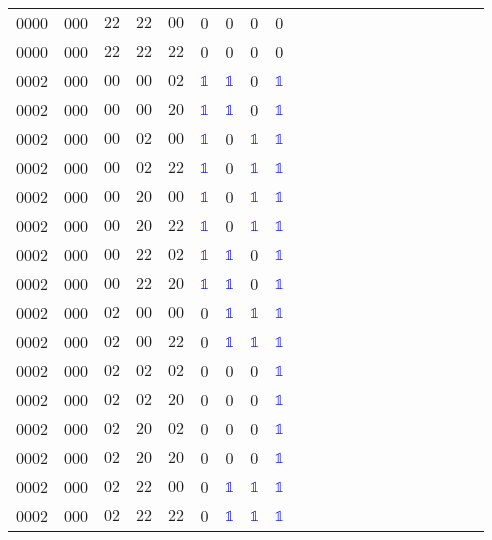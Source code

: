 \begin{longtable*}{c| cccccccccccccccccccc }
0000& 000& $22$& $22$& $00$& 0& 0& 0& 0\\
0000& 000& $22$& $22$& $22$& 0& 0& 0& 0\\
0002& 000& $00$& $00$& $02$& \textcolor{blue}{$\mathds{1}$}& \textcolor{blue}{$\mathds{1}$}& 0& \textcolor{blue}{$\mathds{1}$}\\
0002& 000& $00$& $00$& $20$& \textcolor{blue}{$\mathds{1}$}& \textcolor{blue}{$\mathds{1}$}& 0& \textcolor{blue}{$\mathds{1}$}\\
0002& 000& $00$& $02$& $00$& \textcolor{blue}{$\mathds{1}$}& 0& \textcolor{blue}{$\mathds{1}$}& \textcolor{blue}{$\mathds{1}$}\\
0002& 000& $00$& $02$& $22$& \textcolor{blue}{$\mathds{1}$}& 0& \textcolor{blue}{$\mathds{1}$}& \textcolor{blue}{$\mathds{1}$}\\
0002& 000& $00$& $20$& $00$& \textcolor{blue}{$\mathds{1}$}& 0& \textcolor{blue}{$\mathds{1}$}& \textcolor{blue}{$\mathds{1}$}\\
0002& 000& $00$& $20$& $22$& \textcolor{blue}{$\mathds{1}$}& 0& \textcolor{blue}{$\mathds{1}$}& \textcolor{blue}{$\mathds{1}$}\\
0002& 000& $00$& $22$& $02$& \textcolor{blue}{$\mathds{1}$}& \textcolor{blue}{$\mathds{1}$}& 0& \textcolor{blue}{$\mathds{1}$}\\
0002& 000& $00$& $22$& $20$& \textcolor{blue}{$\mathds{1}$}& \textcolor{blue}{$\mathds{1}$}& 0& \textcolor{blue}{$\mathds{1}$}\\
0002& 000& $02$& $00$& $00$& 0& \textcolor{blue}{$\mathds{1}$}& \textcolor{blue}{$\mathds{1}$}& \textcolor{blue}{$\mathds{1}$}\\
0002& 000& $02$& $00$& $22$& 0& \textcolor{blue}{$\mathds{1}$}& \textcolor{blue}{$\mathds{1}$}& \textcolor{blue}{$\mathds{1}$}\\
0002& 000& $02$& $02$& $02$& 0& 0& 0& \textcolor{blue}{$\mathds{1}$}\\
0002& 000& $02$& $02$& $20$& 0& 0& 0& \textcolor{blue}{$\mathds{1}$}\\
0002& 000& $02$& $20$& $02$& 0& 0& 0& \textcolor{blue}{$\mathds{1}$}\\
0002& 000& $02$& $20$& $20$& 0& 0& 0& \textcolor{blue}{$\mathds{1}$}\\
0002& 000& $02$& $22$& $00$& 0& \textcolor{blue}{$\mathds{1}$}& \textcolor{blue}{$\mathds{1}$}& \textcolor{blue}{$\mathds{1}$}\\
0002& 000& $02$& $22$& $22$& 0& \textcolor{blue}{$\mathds{1}$}& \textcolor{blue}{$\mathds{1}$}& \textcolor{blue}{$\mathds{1}$}\\

\end{longtable*}
